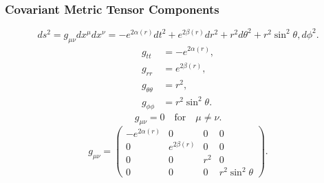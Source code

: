 \documentclass[11pt, a4paper]{report}
\begin{document}
\subsubsection{Covariant Metric Tensor Components}
\begin{equation}
ds^2 = g_{\mu\nu} dx^\mu dx^\nu = -e^{2\alpha(r)} dt^2 + e^{2\beta(r)} dr^2 + r^2 d\theta^2 + r^2 \sin^2\theta , d\phi^2.
\end{equation}
\begin{align}
g_{tt} &= -e^{2\alpha(r)}, \\
g_{rr} &= e^{2\beta(r)}, \\
g_{\theta\theta} &= r^2, \\
g_{\phi\phi} &= r^2 \sin^2\theta.
\end{align}
\begin{equation}
g_{\mu\nu} = 0 \quad \text{for} \quad \mu \neq \nu.
\end{equation}
\begin{equation}
g_{\mu\nu} = \begin{pmatrix}
-e^{2\alpha(r)} & 0 & 0 & 0 \\
0 & e^{2\beta(r)} & 0 & 0 \\
0 & 0 & r^2 & 0 \\
0 & 0 & 0 & r^2 \sin^2\theta
\end{pmatrix}.
\end{equation}
\end{document}

